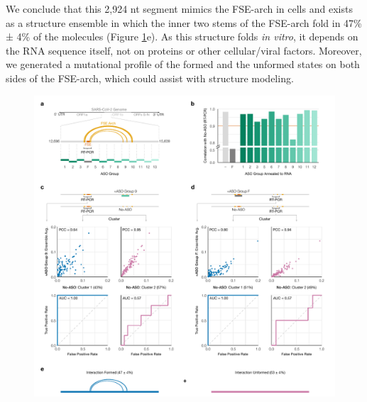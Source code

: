 \documentclass[main.tex]{subfiles}
\begin{document}
We conclude that this 2,924 nt segment mimics the FSE-arch in cells and exists as a structure ensemble in which the inner two stems of the FSE-arch fold in 47\% ± 4\% of the molecules (Figure \ref{tiles}e).
As this structure folds \textit{in vitro}, it depends on the RNA sequence itself, not on proteins or other cellular/viral factors.
Moreover, we generated a mutational profile of the formed and the unformed states on both sides of the FSE-arch, which could assist with structure modeling.

\begin{figure}[ht]
	\includegraphics[width=\textwidth]{../MainFigures/sars2-tile/sars2-tile.pdf}
	\caption{}
	\label{tiles}
\end{figure}





\end{document}
